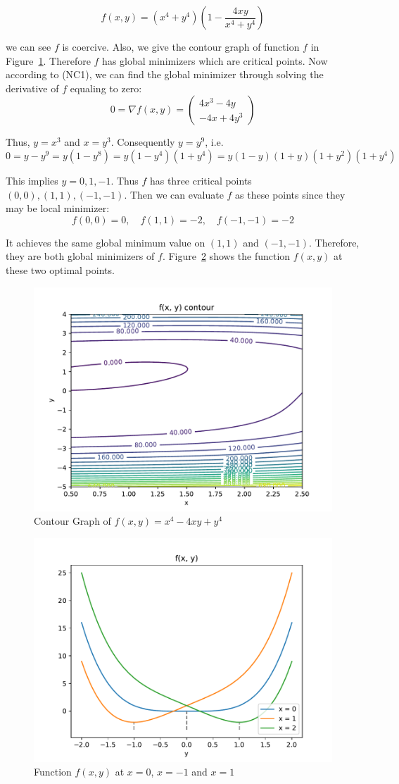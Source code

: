 $$
f(x, y)=\left(x^{4}+y^{4}\right)\left(1-\frac{4 x y}{x^{4}+y^{4}}\right)
$$
\par we can see $f$ is coercive. Also, we give the contour graph of function $f$ in Figure~\ref{fig:unconseg}. Therefore $f$ has global minimizers which are critical points. Now according to (NC1), we can find the global minimizer through solving the derivative of $f$ equaling to zero:
$$
0=\nabla f(x, y)=\left(\begin{array}{c}4 x^{3}-4 y \\ -4 x+4 y^{3}\end{array}\right)
$$
\par Thus, $y = x^3$ and $x = y^3$. Consequently $y = y^9$, i.e.
$$
0=y-y^{9}=y\left(1-y^{8}\right)=y\left(1-y^{4}\right)\left(1+y^{4}\right)=y(1-y)(1+y)\left(1+y^{2}\right)\left(1+y^{4}\right)
$$
\par This implies $y = 0, 1, -1$. Thus $f$ has three critical points $(0,0), (1,1), (-1,-1)$. Then we can evaluate $f$ as these points since they may be local minimizer:
$$
f(0,0)=0, \quad f(1,1)=-2, \quad f(-1,-1)=-2
$$
\par It achieves the same global minimum value on $(1, 1)$ and $(-1, -1)$. Therefore, they are both global minimizers of $f$. Figure~\ref{fig:example12_solution} shows the function $f(x,y)$ at these two optimal points. 
\begin{figure}[t]
\label{fig:unconseg}
\centering
    \includegraphics[page=1,width=.7\columnwidth]{figs/contour_21.pdf}
\caption{Contour Graph of $f(x, y)=x^{4}-4 x y+y^{4}$}
\end{figure}
\begin{figure}[t]
    \label{fig:example12_solution}
    \centering
    \includegraphics[page=1,width=.7\columnwidth]{figs/solution_21.pdf} 
  \caption{Function $f(x,y)$ at $x = 0$, $x=-1$ and $x=1$ }
 \end{figure}

